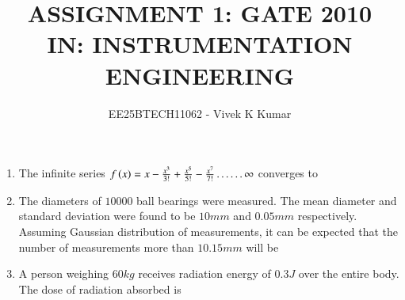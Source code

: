 \documentclass[journal,12pt,onecolumn]{IEEEtran}
\theoremstyle{remark}
\begin{document}
\title{
ASSIGNMENT 1: GATE 2010 \\
IN: INSTRUMENTATION ENGINEERING}
\author{EE25BTECH11062 - Vivek K Kumar}
\maketitle
\renewcommand{\thefigure}{\theenumi}
\renewcommand{\thetable}{\theenumi}
\begin{enumerate}

\item The infinite series $f\left(x\right) = x - \frac{x^3}{3!} + \frac{x^5}{5!} - \frac{x^7}{7!} \dots \dots \infty$ converges to

\hfill{}
\begin{enumerate}
\end{enumerate}

\item The diameters of $10000$ ball bearings were measured. The mean diameter and standard deviation were found to be $10mm$ and $0.05mm$ respectively. Assuming Gaussian distribution of measurements, it can be expected that the number of measurements more than $ 10.15 mm$ will be

\hfill{}
\begin{enumerate}
\end{enumerate}

\item A person weighing $60kg$ receives radiation energy of $0.3J$ over the entire body. The dose of radiation absorbed  is

\hfill{}
\begin{enumerate}
\end{enumerate}


\end{enumerate}
\end{document}
